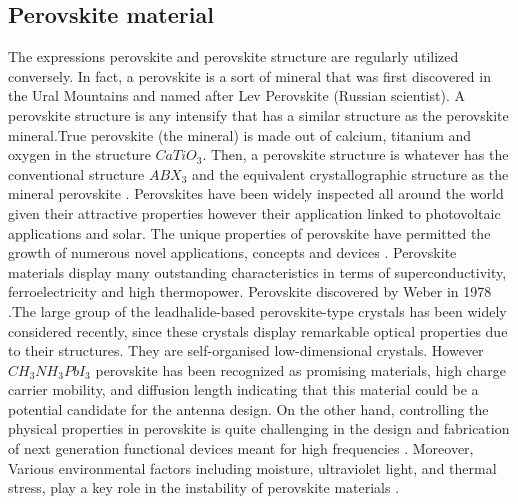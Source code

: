 \documentclass[12pt]{suhbook}
\begin{document}
\subsection{Perovskite material}
The expressions perovskite and perovskite structure are regularly utilized conversely. In fact, a perovskite is a sort of mineral that was first discovered in the Ural Mountains and named after Lev Perovskite (Russian scientist)\cite{park2016organic}. A perovskite structure is any intensify that has a similar structure as the perovskite mineral.True perovskite (the mineral) is made out of calcium, titanium and oxygen in the structure $CaTiO_3$. Then, a perovskite structure is whatever has the conventional structure $ABX_3$ and the equivalent crystallographic structure as the mineral perovskite \cite{chanana2017colour}. Perovskites have been widely inspected all around the world given their attractive properties however their application linked to photovoltaic applications and solar\cite{song2015perovskite}. The unique properties of perovskite have permitted the growth of numerous novel applications, concepts and devices \cite{song2015perovskite}. Perovskite materials display many outstanding characteristics in terms of superconductivity, ferroelectricity and high thermopower\cite{kulkarni2012mixed}. Perovskite discovered by Weber in 1978 \cite{noel2014enhanced}.The large group of the leadhalide-based perovskite-type crystals has been widely considered  recently, since these crystals display remarkable optical properties due to their structures. They are self-organised low-dimensional crystals. However $CH_3NH_3PbI_3$ perovskite has been recognized as promising materials, high charge carrier mobility, and diffusion length indicating that this material could be a potential candidate for the antenna design. On the other hand, controlling the physical properties in perovskite is quite challenging in the design and fabrication of next generation functional devices meant for high frequencies \cite{ahmad2017instability}. Moreover, Various environmental factors including moisture, ultraviolet light, and thermal stress, play a key role in the instability of perovskite materials \cite{green2014emergence}.
\end{document}
